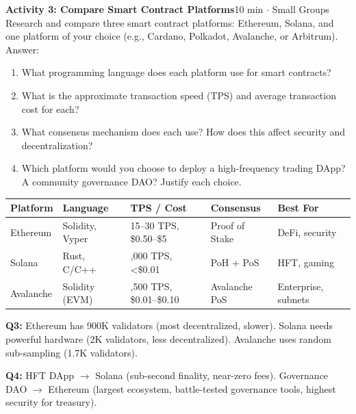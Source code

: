 \documentclass[11pt,a4paper]{article}
\newcommand{\activitybox}[3]{%
  \noindent\colorbox{mllavender4}{\parbox{\dimexpr\linewidth-2\fboxsep}{%
    \textbf{\color{mlpurple}#1}\hfill\textcolor{mlgray}{\small #2}\\[2pt]#3%
  }}\par\vspace{4pt}%
}
\begin{document}
\vspace{2pt}

\activitybox{Activity 3: Compare Smart Contract Platforms}{10 min $\cdot$ Small Groups}{%
Research and compare three smart contract platforms: Ethereum, Solana, and one platform of your choice (e.g., Cardano, Polkadot, Avalanche, or Arbitrum). Answer:
\begin{enumerate}
\item What programming language does each platform use for smart contracts?
\item What is the approximate transaction speed (TPS) and average transaction cost for each?
\item What consensus mechanism does each use? How does this affect security and decentralization?
\item Which platform would you choose to deploy a high-frequency trading DApp? A community governance DAO? Justify each choice.
\end{enumerate}
\vspace{4pt}
{\footnotesize\renewcommand{\arraystretch}{1.35}%
\setlength{\tabcolsep}{5pt}%
\begin{tabular}{@{}p{2.6cm}p{2.6cm}p{2.6cm}p{2.2cm}p{2.8cm}@{}}
\toprule
\textbf{Platform} & \textbf{Language} & \textbf{TPS / Cost} & \textbf{Consensus} & \textbf{Best For} \\
\midrule
{\scriptsize Ethereum} & {\scriptsize Solidity, Vyper} & {\scriptsize 15--30 TPS, \$0.50--\$5} & {\scriptsize Proof of Stake} & {\scriptsize DeFi, security} \\
{\scriptsize Solana} & {\scriptsize Rust, C/C++} & {\scriptsize \texttildelow4,000 TPS, <\$0.01} & {\scriptsize PoH + PoS} & {\scriptsize HFT, gaming} \\
{\scriptsize Avalanche} & {\scriptsize Solidity (EVM)} & {\scriptsize \texttildelow4,500 TPS, \$0.01--\$0.10} & {\scriptsize Avalanche PoS} & {\scriptsize Enterprise, subnets} \\
\bottomrule
\end{tabular}}
\vspace{2pt}
}

\begin{answerbox}
\small
\textbf{Q3:} Ethereum has \texttildelow900K validators (most decentralized, slower). Solana needs powerful hardware (\texttildelow2K validators, less decentralized). Avalanche uses random sub-sampling (\texttildelow1.7K validators).

\textbf{Q4:} HFT DApp $\to$ Solana (sub-second finality, near-zero fees). Governance DAO $\to$ Ethereum (largest ecosystem, battle-tested governance tools, highest security for treasury).
\end{answerbox}
\end{document}
